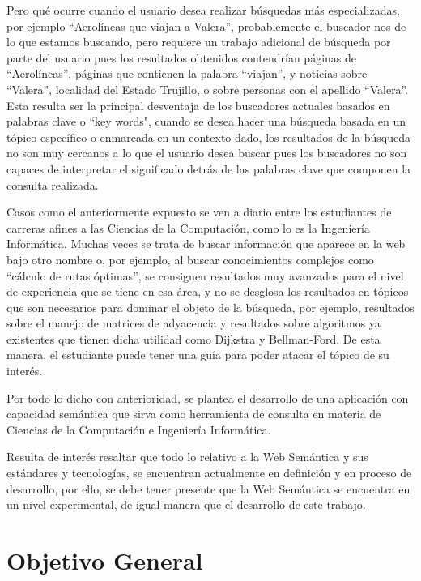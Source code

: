 Pero qué ocurre cuando el usuario desea realizar búsquedas más especializadas, por ejemplo ``Aerolíneas que viajan a Valera”, probablemente el buscador nos de lo que estamos buscando, pero requiere un trabajo adicional de búsqueda por parte del usuario pues los resultados obtenidos contendrían páginas de ``Aerolíneas”, páginas que contienen la palabra ``viajan”, y noticias sobre ``Valera”, localidad del Estado Trujillo, o sobre personas con el apellido ``Valera”. Esta resulta ser la principal desventaja de los buscadores actuales basados en palabras clave o ``key words", cuando se desea hacer una búsqueda basada en un tópico específico o enmarcada en un contexto dado, los resultados de la búsqueda no son muy cercanos a lo que el usuario desea buscar pues los buscadores no son capaces de interpretar el significado detrás de las palabras clave que componen la consulta realizada.

Casos como el anteriormente expuesto se ven a diario entre los estudiantes de carreras afines a las Ciencias de la Computación, como lo es la Ingeniería Informática. Muchas veces se trata de buscar información que aparece en la web bajo otro nombre o, por ejemplo, al buscar conocimientos complejos como ``cálculo de rutas óptimas”, se consiguen resultados muy avanzados para el nivel de experiencia que se tiene en esa área, y no se desglosa los resultados en tópicos que son necesarios para dominar el objeto de la búsqueda, por ejemplo, resultados sobre el manejo de matrices de adyacencia y resultados sobre algoritmos ya existentes que tienen dicha utilidad como Dijkstra y Bellman-Ford. De esta manera, el estudiante puede tener una guía para poder atacar el tópico de su interés.

Por todo lo dicho con anterioridad, se plantea el desarrollo de una aplicación  con capacidad semántica que sirva como herramienta de consulta en materia de Ciencias de la Computación e Ingeniería Informática.

Resulta de interés resaltar que todo lo relativo a la Web Semántica y sus estándares y tecnologías, se encuentran actualmente en definición y en proceso de desarrollo, por ello, se debe tener presente que la Web Semántica se encuentra en un nivel experimental, de igual manera que el desarrollo de este trabajo.

\newpage


\section{Objetivo General }

